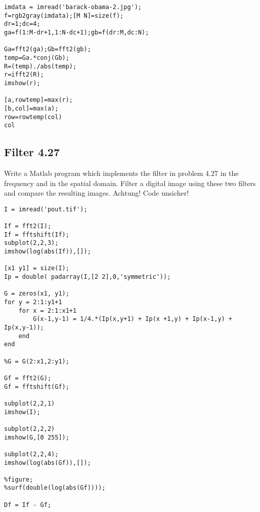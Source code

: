 \begin{lstlisting}
imdata = imread('barack-obama-2.jpg');
f=rgb2gray(imdata);[M N]=size(f);
dr=1;dc=4;
ga=f(1:M-dr+1,1:N-dc+1);gb=f(dr:M,dc:N);

Ga=fft2(ga);Gb=fft2(gb);
temp=Ga.*conj(Gb);
R=(temp)./abs(temp);
r=ifft2(R);
imshow(r);

[a,rowtemp]=max(r);
[b,col]=max(a);
row=rowtemp(col)
col
\end{lstlisting}
\subsection{Filter 4.27}
Write a Matlab program which implements the filter in problem 4.27 in the
frequency and in the spatial domain. Filter a digital image using these two filters and compare the resulting images.
Achtung! Code unsicher!
\begin{lstlisting}
I = imread('pout.tif');

If = fft2(I);
If = fftshift(If);
subplot(2,2,3);
imshow(log(abs(If)),[]);

[x1 y1] = size(I);
Ip = double( padarray(I,[2 2],0,'symmetric'));

G = zeros(x1, y1);
for y = 2:1:y1+1
    for x = 2:1:x1+1
        G(x-1,y-1) = 1/4.*(Ip(x,y+1) + Ip(x +1,y) + Ip(x-1,y) + Ip(x,y-1));
    end
end

%G = G(2:x1,2:y1);

Gf = fft2(G);
Gf = fftshift(Gf);

subplot(2,2,1)
imshow(I);

subplot(2,2,2)
imshow(G,[0 255]);

subplot(2,2,4);
imshow(log(abs(Gf)),[]);

%figure;
%surf(double(log(abs(Gf))));

Df = If - Gf;
\end{lstlisting}

